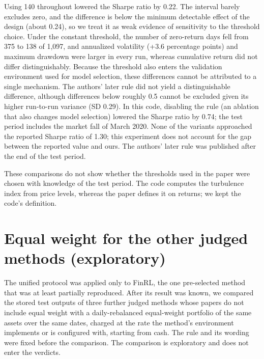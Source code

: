 \documentclass[12pt,a4paper]{report}
\begin{document}
Using 140 throughout lowered the Sharpe ratio by 0.22. The interval
barely excludes zero, and the difference is below the minimum detectable
effect of the design (about 0.24), so we treat it as weak evidence of
sensitivity to the threshold choice. Under the constant threshold, the
number of zero-return days fell from 375 to 138 of 1,097, and annualized
volatility (+3.6 percentage points) and maximum drawdown were larger in
every run, whereas cumulative return did not differ distinguishably.
Because the threshold also enters the validation environment used for
model selection, these differences cannot be attributed to a single
mechanism. The authors' later rule did not yield a distinguishable
difference, although differences below roughly 0.5 cannot be excluded
given its higher run-to-run variance (SD 0.29). In this code, disabling
the rule (an ablation that also changes model selection) lowered the
Sharpe ratio by 0.74; the test period includes the market fall of March
2020. None of the variants approached the reported Sharpe ratio of 1.30;
this experiment does not account for the gap between the reported value
and ours. The authors' later rule was published after the end of the
test period.

These comparisons do not show whether the thresholds used in the paper
were chosen with knowledge of the test period. The code computes the
turbulence index from price levels, whereas the paper defines it on
returns; we kept the code's definition.

\section{Equal weight for the other judged methods
(exploratory)}\label{equal-weight-for-the-other-judged-methods-exploratory}

The unified protocol was applied only to FinRL, the one pre-selected
method that was at least partially reproduced. After its result was
known, we compared the stored test outputs of three further judged
methods whose papers do not include equal weight with a daily-rebalanced
equal-weight portfolio of the same assets over the same dates, charged
at the rate the method's environment implements or is configured with,
starting from cash. The rule and its wording were fixed before the
comparison. The comparison is exploratory and does not enter the
verdicts.
\end{document}
